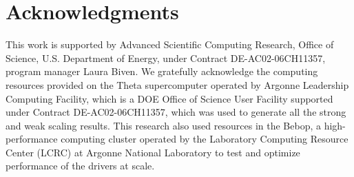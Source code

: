 \section*{Acknowledgments}

This work is supported by Advanced Scientific Computing Research, Office of Science, U.S. Department of Energy, under Contract DE-AC02-06CH11357, program manager Laura Biven. We gratefully acknowledge the computing resources provided on the Theta supercomputer operated by Argonne Leadership Computing Facility, which is a DOE Office of Science User Facility supported under Contract DE-AC02-06CH11357, which was used to generate all the strong and weak scaling results. This research also used resources in the Bebop, a high-performance computing cluster operated by the Laboratory Computing Resource Center (LCRC) at Argonne National Laboratory to test and optimize performance of the drivers at scale.


